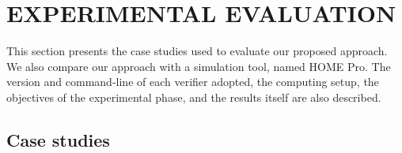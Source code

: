 \documentclass[review]{elsarticle}
\begin{document}
\section{EXPERIMENTAL EVALUATION}
\label{sec:Results}

This section presents the case studies used to evaluate our proposed approach. 
We also compare our approach with a simulation tool, named HOME Pro. 
The version and command-line of each verifier adopted, 
the computing setup, the objectives of the experimental phase, 
and the results itself are also described.

\subsection{Case studies} 
\end{document}
